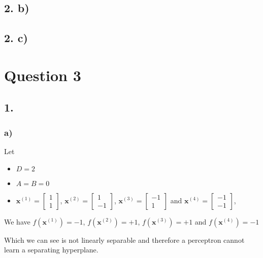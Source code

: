 \documentclass[11pt]{article}
\begin{document}
\subsection{2. b)}
\subsection{2. c)}
\pagebreak
\section{Question 3}
\subsection{1.}
\subsubsection{a)}
Let
\begin{itemize}
  \item $D = 2$
  \item $A = B = 0$
  \item $\bm{x}^{(1)} = \begin{bmatrix} 1 \\ 1\end{bmatrix}$, $\bm{x}^{(2)} = \begin{bmatrix} 1 \\ -1\end{bmatrix}$, $\bm{x}^{(3)} = \begin{bmatrix} -1 \\ 1\end{bmatrix}$ and $\bm{x}^{(4)} = \begin{bmatrix} -1 \\ -1\end{bmatrix}$, 
  \end{itemize}
  We have $f ( \bm{x}^{(1)}) = -1$, $f ( \bm{x}^{(2)}) = +1$, $f ( \bm{x}^{(3)}) = +1$ and $f ( \bm{x}^{(4)}) = -1$

  \begin{figure}[h!]
  \end{figure}
  Which we can see is not linearly separable and therefore a perceptron cannot learn a separating hyperplane.
\pagebreak
\end{document}
